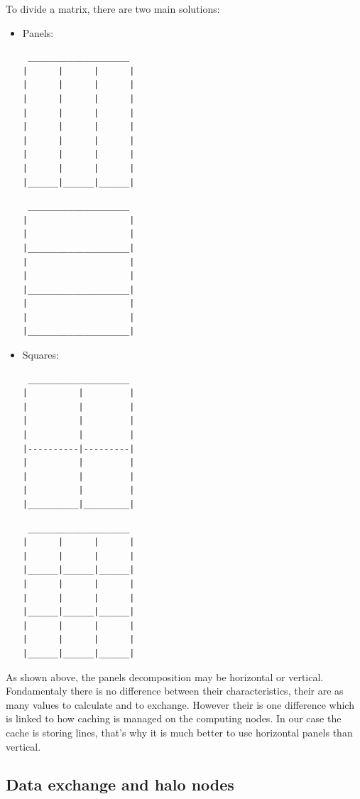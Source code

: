 \documentclass[a4paper,11pt]{article}
\begin{document}
To divide a matrix, there are two main solutions:
\begin{itemize}
\item{Panels:
\begin{multicols}{2}
\begin{verbatim}
 ____________________
|      |      |      |
|      |      |      |
|      |      |      |
|      |      |      |
|      |      |      |
|      |      |      |
|      |      |      |
|      |      |      |
|______|______|______|
\end{verbatim}
\vspace{1em}
\begin{verbatim}
 ____________________
|                    |
|                    |
|____________________|
|                    |
|                    |
|____________________|
|                    |
|                    |
|____________________|
\end{verbatim}

\end{multicols}
}
\item{Squares:
\begin{multicols}{2}
\begin{verbatim}
 ____________________
|          |         |
|          |         |
|          |         |
|          |         |
|----------|---------|
|          |         |
|          |         |
|          |         |
|__________|_________|
\end{verbatim}

\begin{verbatim}
 ____________________
|      |      |      |
|      |      |      |
|______|______|______|
|      |      |      |
|      |      |      |
|______|______|______|
|      |      |      |
|      |      |      |
|______|______|______|
\end{verbatim}
\end{multicols}
}
\end{itemize}

As shown above, the panels decomposition may be horizontal or vertical. Fondamentaly there
is no difference between their characteristics, their are as many values to calculate and to
exchange. However their is one difference which is linked to how caching is managed on the
computing nodes. In our case the cache is storing lines, that's why it is much better to use
horizontal panels than vertical.

\subsection{Data exchange and halo nodes}
\end{document}
